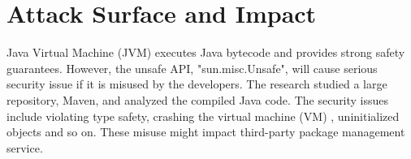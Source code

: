 \section{Attack Surface and Impact}


Java Virtual Machine (JVM) executes Java bytecode and provides strong safety
guarantees. However, the unsafe API, "sun.misc.Unsafe", will cause serious 
security issue if it is misused by the developers. The research \cite{10.1145/2814270.2814313} 
studied a large repository, Maven, and analyzed the compiled Java code. The 
security issues include violating type safety, crashing the virtual machine (VM)
, uninitialized objects and so on. These misuse might impact third-party package 
management service. 